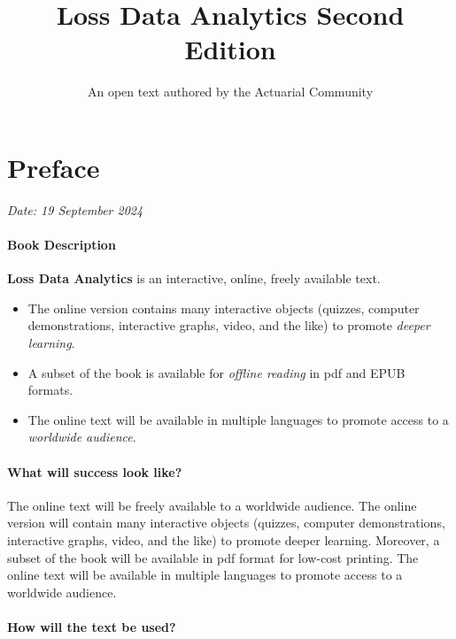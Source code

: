 \documentclass[
  12pt,
  krantz2]{Format/krantzNoCorner}
\title{Loss Data Analytics \newline Second Edition}
\author{An open text authored by the Actuarial Community}
\date{}
\providecommand{\tightlist}{%
  \setlength{\itemsep}{0pt}\setlength{\parskip}{0pt}}
\begin{document}
\maketitle

{
\hypersetup{linkcolor=}
\setcounter{tocdepth}{2}
\tableofcontents
}
\hypertarget{preface}{%
\chapter*{Preface}\label{preface}}


\emph{Date: 19 September 2024}

\hypertarget{book-description}{%
\subsubsection*{Book Description}\label{book-description}}


\textbf{Loss Data Analytics} is an interactive, online, freely available text.

\begin{itemize}
\tightlist
\item
  The online version contains many interactive objects (quizzes, computer demonstrations, interactive graphs, video, and the like) to promote \emph{deeper learning}.
\item
  A subset of the book is available for \emph{offline reading} in pdf and EPUB formats.
\item
  The online text will be available in multiple languages to promote access to a \emph{worldwide audience}.
\end{itemize}

\hypertarget{what-will-success-look-like}{%
\subsubsection*{What will success look like?}\label{what-will-success-look-like}}


The online text will be freely available to a worldwide audience. The online version will contain many interactive objects (quizzes, computer demonstrations, interactive graphs, video, and the like) to promote deeper learning. Moreover, a subset of the book will be available in pdf format for low-cost printing. The online text will be available in multiple languages to promote access to a worldwide audience.

\hypertarget{how-will-the-text-be-used}{%
\subsubsection*{How will the text be used?}\label{how-will-the-text-be-used}}
\end{document}
